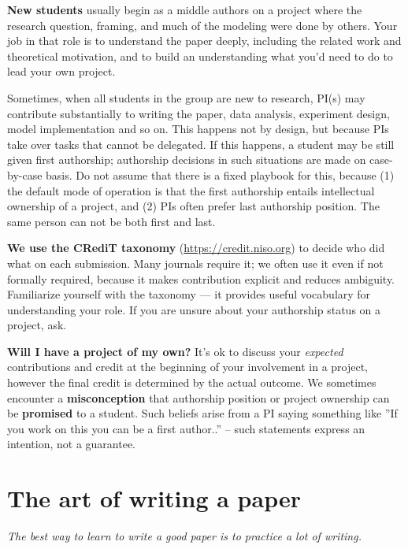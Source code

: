 \documentclass[11pt, letterpaper]{article}
\begin{document}
\textbf{New students} usually begin as a middle authors on a project where the research question, framing, and much of the modeling were done by others. Your job in that role is to understand the paper deeply, including the related work and theoretical motivation, and to build an understanding what you'd need to do to lead your own project. 

Sometimes, when all students in the group are new to research, PI(s) may contribute substantially to writing the paper, data analysis, experiment design, model implementation and so on. This happens not by design, but because PIs take over tasks that cannot be delegated. If this happens, a student may be still given first authorship; authorship decisions in such situations are made on case-by-case basis. Do not assume that there is a fixed playbook for this, because (1) the default mode of operation is that the first authorship entails intellectual ownership of a project, and (2) PIs often prefer last authorship position. The same person can not be both first and last.

\textbf{We use the CRediT taxonomy} (\url{https://credit.niso.org}) to decide who did what on each submission. Many journals require it; we often use it even if not formally required, because it makes contribution explicit and reduces ambiguity. Familiarize yourself with the taxonomy --- it provides useful vocabulary for understanding your role. If you are unsure about your authorship status on a project, ask. 

\textbf{Will I have a project of my own?}
It's ok to discuss your \textit{expected} contributions and credit at the beginning of your involvement in a project, however the final credit is determined by the actual outcome. We sometimes encounter a \textbf{misconception} that authorship position or project ownership can be \textbf{promised} to a student. Such beliefs arise from a PI saying something like ''If you work on this you can be a first author..'' -- such statements express an intention, not a guarantee. 




\section{The art of writing a paper}

\vspace{1cm}
\begin{mdframed}
\textit{The best way to learn to write a good paper is to practice a lot of writing.}
\end{mdframed}
\end{document}
